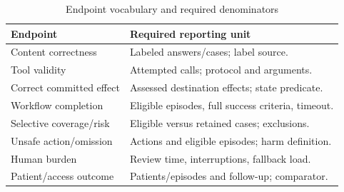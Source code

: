 \begin{table}[t]\caption{Endpoint vocabulary and required denominators}\label{tab:metrics}\centering\footnotesize
\begin{tabularx}{\columnwidth}{@{}p{}Y@{}}\toprule
Endpoint & Required reporting unit \\ \midrule
Content correctness & Labeled answers/cases; label source.\\
Tool validity & Attempted calls; protocol and arguments.\\
Correct committed effect & Assessed destination effects; state predicate.\\
Workflow completion & Eligible episodes, full success criteria, timeout.\\
Selective coverage/risk & Eligible versus retained cases; exclusions.\\
Unsafe action/omission & Actions and eligible episodes; harm definition.\\
Human burden & Review time, interruptions, fallback load.\\
Patient/access outcome & Patients/episodes and follow-up; comparator.\\ \bottomrule
\end{tabularx}\end{table}
